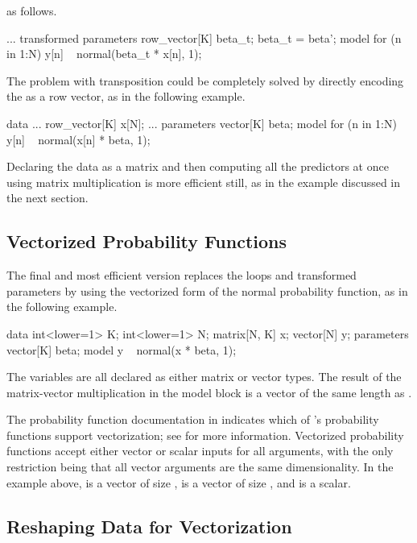 as follows.
%
\begin{stancode}
...
transformed parameters {
  row_vector[K] beta_t;
  beta_t = beta';
}
model {
  for (n in 1:N)
    y[n] ~ normal(beta_t * x[n], 1);
}
\end{stancode}
%
The problem with transposition could be completely solved by directly
encoding the  as a row vector, as in the
following example.
%
\begin{stancode}
data {
  ...
  row_vector[K] x[N];
  ...
}
parameters {
  vector[K] beta;
}
model {
  for (n in 1:N)
    y[n] ~ normal(x[n] * beta, 1);
}
\end{stancode}
%
Declaring the data as a matrix and then computing all the predictors
at once using matrix multiplication is more efficient still, as in the
example discussed in the next section.

\subsection{Vectorized Probability Functions}

The final and most efficient version replaces the loops and
transformed parameters by using the vectorized form of the normal
probability function, as in the following example.
%
\begin{stancode}
data {
  int<lower=1> K;
  int<lower=1> N;
  matrix[N, K] x;
  vector[N] y;
}
parameters {
  vector[K] beta;
} 
model {
  y ~ normal(x * beta, 1);
}
\end{stancode}
%
The variables are all declared as either matrix or vector types.
The result of the matrix-vector multiplication  in the
model block is a vector of the same length as .  

The probability function documentation in 
indicates which of \Stan's probability functions support
vectorization; see  for more
information.  Vectorized probability functions accept either vector or
scalar inputs for all arguments, with the only restriction being that
all vector arguments are the same dimensionality.  In the example
above,  is a vector of size ,  is a
vector of size , and  is a scalar.

\subsection{Reshaping Data for Vectorization}

